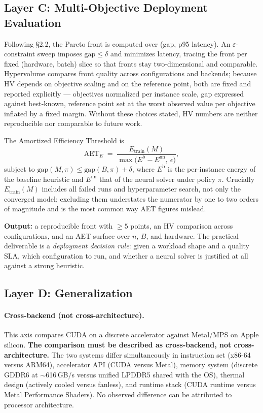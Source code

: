 \documentclass[11pt,a4paper,twocolumn]{article}
\begin{document}
\subsection{Layer C: Multi-Objective Deployment Evaluation}

Following \S2.2, the Pareto front is computed over (gap, p95 latency). An
$\varepsilon$-constraint sweep imposes $\mathrm{gap} \le \delta$ and minimizes
latency, tracing the front per fixed (hardware, batch) slice so that fronts stay
two-dimensional and comparable. Hypervolume compares front quality across
configurations and backends; because HV depends on objective scaling and on the
reference point, both are fixed and reported explicitly --- objectives normalized
per instance scale, gap expressed against best-known, reference point set at the
worst observed value per objective inflated by a fixed margin. Without these
choices stated, HV numbers are neither reproducible nor comparable to future work.

The Amortized Efficiency Threshold is
\begin{equation}
  \mathrm{AET}_E \;=\; \frac{E_{\mathrm{train}}(M)}
  {\max\bigl(E^{\mathrm{b}} - E^{\mathrm{nn}},\ \epsilon\bigr)},
\end{equation}
subject to $\mathrm{gap}(M,\pi) \le \mathrm{gap}(B,\pi) + \delta$, where
$E^{\mathrm{b}}$ is the per-instance energy of the baseline heuristic and
$E^{\mathrm{nn}}$ that of the neural solver under policy $\pi$. Crucially
$E_{\mathrm{train}}(M)$ includes all failed runs and hyperparameter search, not
only the converged model; excluding them understates the numerator by one to two
orders of magnitude and is the most common way AET figures mislead.

\textbf{Output:} a reproducible front with $\ge 5$ points, an HV comparison across
configurations, and an AET surface over $n$, $B$, and hardware. The practical
deliverable is a \emph{deployment decision rule}: given a workload shape and a
quality SLA, which configuration to run, and whether a neural solver is justified
at all against a strong heuristic.

\subsection{Layer D: Generalization}
\label{sec:crossmodel}

\paragraph{Cross-backend (not cross-architecture).} This axis compares CUDA on a
discrete accelerator against Metal/MPS on Apple silicon. \textbf{The comparison must
be described as cross-backend, not cross-architecture.} The two systems differ
simultaneously in instruction set (x86-64 versus ARM64), accelerator API (CUDA
versus Metal), memory system (discrete GDDR6 at $\sim$616\,GB/s versus unified
LPDDR5 shared with the OS), thermal design (actively cooled versus fanless), and
runtime stack (CUDA runtime versus Metal Performance Shaders). No observed
difference can be attributed to processor architecture.
\end{document}
